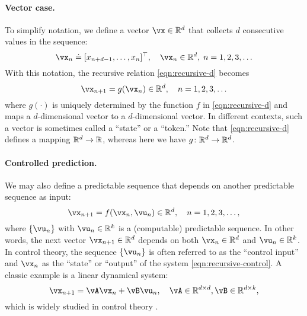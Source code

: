 \documentclass[../../book-main.tex]{subfiles}
\begin{document}
\paragraph{Vector case.}
To simplify notation, we define a vector $\vx \in \R^{d}$ that collects $d$ consecutive values in the sequence:
\begin{equation}
    \vx_{n} \doteq [x_{n+d-1}, \ldots, x_{n}]^{\top}, \quad \vx_{n} \in \R^{d}, \; n = 1, 2, 3, \ldots
\end{equation}
With this notation, the recursive relation \eqref{eqn:recursive-d} becomes
\begin{equation}
    \vx_{n+1} = g(\vx_{n}) \in \R^{d}, \quad n = 1, 2, 3, \ldots
    \label{eqn:recursive-v}
\end{equation}
where $g(\cdot)$ is uniquely determined by the function $f$ in \eqref{eqn:recursive-d} and maps a $d$-dimensional vector to a $d$-dimensional vector. In different contexts, such a vector is sometimes called a ``state'' or a ``token.'' Note that \eqref{eqn:recursive-d} defines a mapping $\mathbb{R}^{d} \to \mathbb{R}$, whereas here we have $g \colon \mathbb{R}^{d} \to \mathbb{R}^{d}$.

\paragraph{Controlled prediction.}
We may also define a predictable sequence that depends on another predictable sequence as input:
\begin{equation}
    \vx_{n+1} = f(\vx_{n}, \vu_{n}) \in \R^{d}, \quad n = 1, 2, 3, \ldots,
\label{eqn:recursive-control}
\end{equation}
where $\{\vu_{n}\}$ with $\vu_{n} \in \R^{k}$ is a (computable) predictable sequence. In other words, the next vector $\vx_{n+1} \in \R^{d}$ depends on both $\vx_{n} \in \R^{d}$ and $\vu_{n} \in \R^{k}$. In control theory, the sequence $\{\vu_{n}\}$ is often referred to as the ``control input'' and $\vx_{n}$ as the ``state'' or ``output'' of the system \eqref{eqn:recursive-control}. A classic example is a linear dynamical system:
\begin{equation}
    \vx_{n+1} = \vA\vx_{n} + \vB\vu_{n}, \quad \vA \in \R^{d \times d}, \vB \in \R^{d \times k},
    \label{eqn:lineary-system} 
\end{equation}
which is widely studied in control theory \cite{Cal:Des}. 
\end{document}
